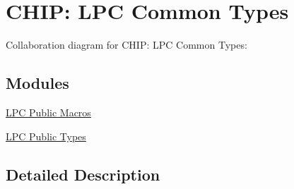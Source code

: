 \hypertarget{group__LPC__Types}{}\section{C\+H\+IP\+: L\+PC Common Types}
\label{group__LPC__Types}
Collaboration diagram for C\+H\+IP\+: L\+PC Common Types\+:
\subsection*{Modules}
\begin{DoxyCompactItemize}
\item 
\hyperlink{group__LPC__Types__Public__Macros}{L\+P\+C Public Macros}
\item 
\hyperlink{group__LPC__Types__Public__Types}{L\+P\+C Public Types}
\end{DoxyCompactItemize}


\subsection{Detailed Description}
